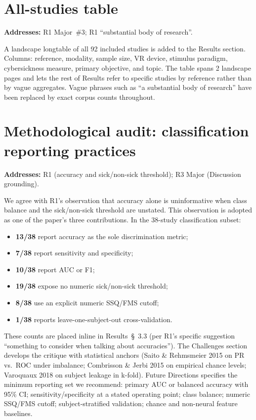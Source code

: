 \documentclass[11pt,a4paper]{article}
\newcommand{\addresses}[1]{\par\noindent\textbf{\small Addresses:} {\small #1}\par\smallskip}
\begin{document}
\section{All-studies table}\label{sec:table}
\addresses{R1 Major~\#3; R1 ``substantial body of research''.}

A landscape long\-table of all 92 included studies is added to the Results section. Columns: reference, modality, sample size, VR device, stimulus paradigm, cybersickness measure, primary objective, and topic. The table spans 2 landscape pages and lets the rest of Results refer to specific studies by reference rather than by vague aggregates. Vague phrases such as ``a substantial body of research'' have been replaced by exact corpus counts throughout.

\section{Methodological audit: classification reporting practices}\label{sec:audit}
\addresses{R1 (accuracy and sick/non-sick threshold); R3 Major (Discussion grounding).}

We agree with R1's observation that accuracy alone is uninformative when class balance and the sick/non-sick threshold are unstated. This observation is adopted as one of the paper's three contributions. In the 38-study classification subset:
\begin{itemize}
  \item \textbf{13/38} report accuracy as the sole discrimination metric;
  \item \textbf{7/38} report sensitivity and specificity;
  \item \textbf{10/38} report AUC or F1;
  \item \textbf{19/38} expose no numeric sick/non-sick threshold;
  \item \textbf{8/38} use an explicit numeric SSQ/FMS cutoff;
  \item \textbf{1/38} reports leave-one-subject-out cross-validation.
\end{itemize}

\noindent These counts are placed inline in Results~\S~3.3 (per R1's specific suggestion ``something to consider when talking about accuracies''). The Challenges section develops the critique with statistical anchors (Saito \& Rehmsmeier 2015 on PR vs.\ ROC under imbalance; Combrisson \& Jerbi 2015 on empirical chance levels; Varoquaux 2018 on subject leakage in k-fold). Future Directions specifies the minimum reporting set we recommend: primary AUC or balanced accuracy with 95\% CI; sensitivity/specificity at a stated operating point; class balance; numeric SSQ/FMS cutoff; subject-stratified validation; chance and non-neural feature baselines.
\end{document}
